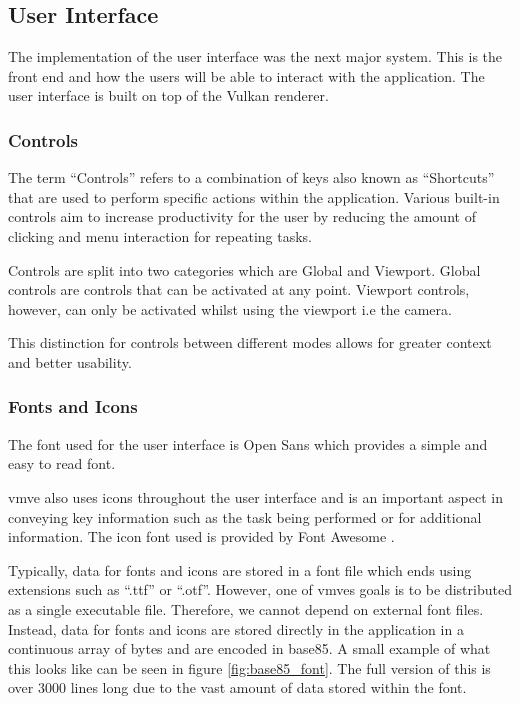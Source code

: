 \documentclass[11pt]{article}
\begin{document}
\subsection{User Interface}
The implementation of the user interface was the next major system. This is
the front end and how the users will be able to interact with the application.
The user interface is built on top of the Vulkan renderer.

\subsubsection{Controls}
The term ``Controls'' refers to a combination of keys also known as
``Shortcuts'' that are used to perform specific actions within the application.
Various built-in controls aim to increase productivity for the user by reducing
the amount of clicking and menu interaction for repeating tasks.

Controls are split into two categories which are Global and Viewport. Global
controls are controls that can be activated at any point. Viewport controls,
however, can only be activated whilst using the viewport i.e the camera.

This distinction for controls between different modes allows for greater context
and better usability. 

\subsubsection{Fonts and Icons}
The font used for the user interface is Open Sans which provides a simple and
easy to read font.

\gls*{vmve} also uses icons throughout the user interface and is an important
aspect in conveying key information such as the task being performed or for
additional information. The icon font used is provided by Font Awesome
\cite{font-awesome}.

Typically, data for fonts and icons are stored in a font file which ends using
extensions such as ``.ttf'' or ``.otf''. However, one of \glspl*{vmve} goals is
to be distributed as a single executable file. Therefore, we cannot depend on
external font files. Instead, data for fonts and icons are stored directly in
the application in a continuous array of bytes and are encoded in base85. A
small example of what this looks like can be seen in figure
\ref{fig:base85_font}. The full version of this is over 3000 lines long due to
the vast amount of data stored within the font.
\end{document}
